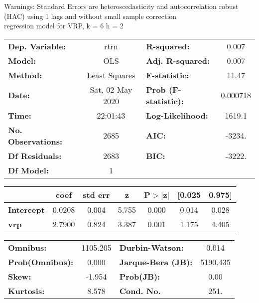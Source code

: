 Warnings: \newline
 [1] Standard Errors are heteroscedasticity and autocorrelation robust (HAC) using 1 lags and without small sample correction\\ 

regression model for VRP, k = 6 h = 2\begin{center}
\begin{tabular}{lclc}
\toprule
\textbf{Dep. Variable:}    &       rtrn       & \textbf{  R-squared:         } &     0.007   \\
\textbf{Model:}            &       OLS        & \textbf{  Adj. R-squared:    } &     0.007   \\
\textbf{Method:}           &  Least Squares   & \textbf{  F-statistic:       } &     11.47   \\
\textbf{Date:}             & Sat, 02 May 2020 & \textbf{  Prob (F-statistic):} &  0.000718   \\
\textbf{Time:}             &     22:01:43     & \textbf{  Log-Likelihood:    } &    1619.1   \\
\textbf{No. Observations:} &        2685      & \textbf{  AIC:               } &    -3234.   \\
\textbf{Df Residuals:}     &        2683      & \textbf{  BIC:               } &    -3222.   \\
\textbf{Df Model:}         &           1      & \textbf{                     } &             \\
\bottomrule
\end{tabular}
\begin{tabular}{lcccccc}
                   & \textbf{coef} & \textbf{std err} & \textbf{z} & \textbf{P$> |$z$|$} & \textbf{[0.025} & \textbf{0.975]}  \\
\midrule
\textbf{Intercept} &       0.0208  &        0.004     &     5.755  &         0.000        &        0.014    &        0.028     \\
\textbf{vrp}       &       2.7900  &        0.824     &     3.387  &         0.001        &        1.175    &        4.405     \\
\bottomrule
\end{tabular}
\begin{tabular}{lclc}
\textbf{Omnibus:}       & 1105.205 & \textbf{  Durbin-Watson:     } &    0.014  \\
\textbf{Prob(Omnibus):} &   0.000  & \textbf{  Jarque-Bera (JB):  } & 5190.435  \\
\textbf{Skew:}          &  -1.954  & \textbf{  Prob(JB):          } &     0.00  \\
\textbf{Kurtosis:}      &   8.578  & \textbf{  Cond. No.          } &     251.  \\
\bottomrule
\end{tabular}
\end{center}

